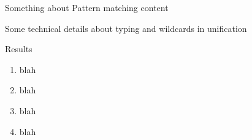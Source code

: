 \documentclass[aspectratio=169
  , xcolor={svgnames}
  , hyperref=
      { colorlinks
      , urlcolor=DarkBlue
      }
  , russian  %
  ]{beamer}
\begin{document}
\begin{frame}{Something about Pattern matching}
content
\end{frame}



\begin{frame}{}
Some technical details about typing and wildcards in unification
\end{frame}



\begin{frame}{Results}

\begin{enumerate}
\item blah
\item blah
\item blah
\item blah

\end{enumerate}
\end{frame}

\begin{comment}


\begin{frame}[allowframebreaks]
\frametitle<presentation>{Ссылки}
\begin{thebibliography}{10}
  \bibitem{blow}
    Предотвращая коллапс цивилизации (Preventing the Collapse of Civilization), 2019 (in English)
    \newblock {\em Jonathan Blow}
    \newblock\href{https://youtu.be/pW-SOdj4Kkk}{YouTube}
  \bibitem{cheatsheets}
    Шпаргалки по синтаксису OCaml
    \newblock {\em OCamlPro}
    \newblock\href{https://ocaml.org/docs/cheat_sheets.html}{4 PDF online}
  \bibitem{rwo}
    Книга Real World OCaml издания 2.0 (есть русский перевод издания 1.0)
    \newblock\href{https://dev.realworldocaml.org/toc.html}{online}
  \bibitem{javaTuringComplete}
    Java Generics are Turing Complete
    \newblock {\em Radu Grigore}
    \newblock\href{https://arxiv.org/pdf/1605.05274}{online}
  \bibitem{algDThistory}
    A Brief History of Algebraic Data Types
    \newblock {\em Li-yao Xia}
    \newblock\href{https://docs.google.com/presentation/d/131_CYsd9mEL-0XqXMyV7JeahWgtNCUV_JwjH7WqYFcI/edit}{online}
\end{thebibliography}
\end{frame}
\end{comment}
\end{document}

